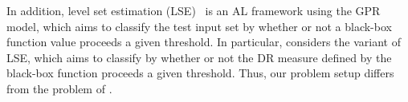 In addition, level set estimation (LSE)~\citep{gotovos2013active,bogunovic2016truncated,inatsu2024active} is an AL framework using the GPR model, which aims to classify the test input set by whether or not a black-box function value proceeds a given threshold.
%
In particular, \citet{inatsu2021active} considers the variant of LSE, which aims to classify by whether or not the DR measure defined by the black-box function proceeds a given threshold.
%
Thus, our problem setup differs from the problem of \citet{inatsu2021active}.



